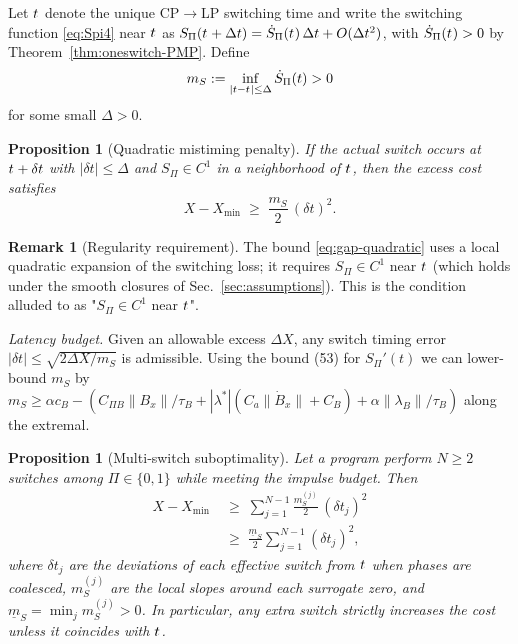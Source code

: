 \documentclass[aps,pre,twocolumn,showpacs,superscriptaddress]{revtex4-2}
\newtheorem{proposition}[theorem]{Proposition}
\theoremstyle{definition}
\newtheorem{remark}[theorem]{Remark}
\begin{document}
Let $t^{\*}$ denote the unique CP$\to$LP switching time and write the switching function \eqref{eq:Spi4} near $t^{\*}$ as $S_\Pi(t^{\*}+\Delta t) = \dot S_\Pi(t^{\*})\,\Delta t + O(\Delta t^2)$, with $\dot S_\Pi(t^{\*})>0$ by Theorem~\ref{thm:oneswitch-PMP}. Define 
\[
m_S:=\inf_{|t-t^{\*}|\le \Delta}\dot S_\Pi(t)>0
\]
for some small $\Delta>0$.

\begin{proposition}[Quadratic mistiming penalty]\label{prop:gap-mistime}
If the actual switch occurs at $t^{\*}+\delta t$ with $|\delta t|\le \Delta$ and $S_\Pi\in C^1$ in a neighborhood of $t^{\*}$, then the excess cost satisfies
\begin{equation}\label{eq:gap-quadratic}
X - X_{\min} \;\ge\; \frac{m_S}{2}\,(\delta t)^2.
\end{equation}
\end{proposition}

\begin{remark}[Regularity requirement]
The bound \eqref{eq:gap-quadratic} uses a local quadratic expansion of the switching loss; it requires $S_\Pi\in C^1$ near $t^{\*}$ (which holds under the smooth closures of Sec.~\ref{sec:assumptions}). This is the condition alluded to as "$S_\Pi\in C^1$ near $t^{\*}$".
\end{remark}

\emph{Latency budget.} Given an allowable excess $\Delta X$, any switch timing error $|\delta t|\le\sqrt{2\Delta X/m_S}$ is admissible. Using the bound (53) for $S_\Pi'(t)$ we can lower-bound $m_S$ by $m_S\ge \alpha c_B - (C_{\Pi B}\|B_x\|/\tau_B + |\lambda^*|(C_a\| \dot B_x\| + C_B) + \alpha\|\lambda_B\|/\tau_B)$ along the extremal.

\begin{proposition}[Multi‑switch suboptimality]\label{prop:multi}
Let a program perform $N\ge 2$ switches among $\Pi\in\{0,1\}$ while meeting the impulse budget. Then
\begin{align}\label{eq:gap-multi}
X - X_{\min} &\;\ge\; \sum_{j=1}^{N-1} \frac{m_S^{(j)}}{2}\,(\delta t_j)^2\nonumber\\
&\;\ge\; \frac{\underline m_S}{2}\sum_{j=1}^{N-1}(\delta t_j)^2,
\end{align}
where $\delta t_j$ are the deviations of each effective switch from $t^{\*}$ when phases are coalesced, $m_S^{(j)}$ are the local slopes around each surrogate zero, and $\underline m_S=\min_j m_S^{(j)}>0$. In particular, \emph{any} extra switch strictly increases the cost unless it coincides with $t^{\*}$.
\end{proposition}
\end{document}
